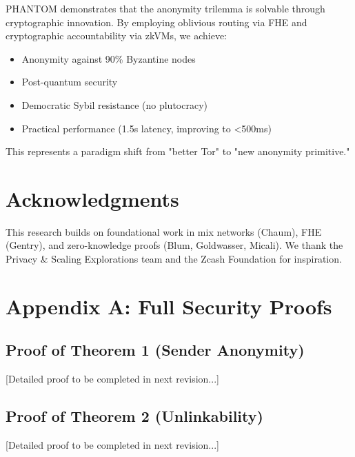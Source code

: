 \documentclass[11pt]{article}
\begin{document}
PHANTOM demonstrates that the anonymity trilemma is solvable through cryptographic innovation. By employing oblivious routing via FHE and cryptographic accountability via zkVMs, we achieve:

\begin{itemize}
\item Anonymity against 90\% Byzantine nodes
\item Post-quantum security
\item Democratic Sybil resistance (no plutocracy)
\item Practical performance (1.5s latency, improving to <500ms)
\end{itemize}

This represents a paradigm shift from "better Tor" to "new anonymity primitive."

\section{Acknowledgments}

This research builds on foundational work in mix networks (Chaum), FHE (Gentry), and zero-knowledge proofs (Blum, Goldwasser, Micali). We thank the Privacy \& Scaling Explorations team and the Zcash Foundation for inspiration.




\appendix

\section{Appendix A: Full Security Proofs}

\subsection{Proof of Theorem 1 (Sender Anonymity)}

[Detailed proof to be completed in next revision...]

\subsection{Proof of Theorem 2 (Unlinkability)}

[Detailed proof to be completed in next revision...]
\end{document}
